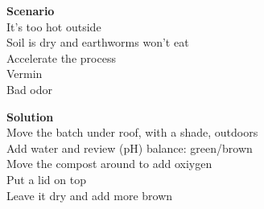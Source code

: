 \documentclass[10pt, a4paper,nodate]{article} %
\begin{document}
\noindent
\begin{minipage}{.5\textwidth}
\textbf{Scenario} \\
It's too hot outside \\ 
Soil is dry and earthworms won't eat \\ 
Accelerate the process	\\               
Vermin	\\                               
Bad odor \\                                 
\end{minipage}%
\begin{minipage}{.5\textwidth}
\textbf{Solution} \\
 Move the batch under roof, with a shade, outdoors \\
 Add water and review (pH) balance: green/brown \\
 Move the compost around to add oxiygen \\
 Put a lid on top \\
 Leave it dry and add more brown \\
\end{minipage}




\end{document}
